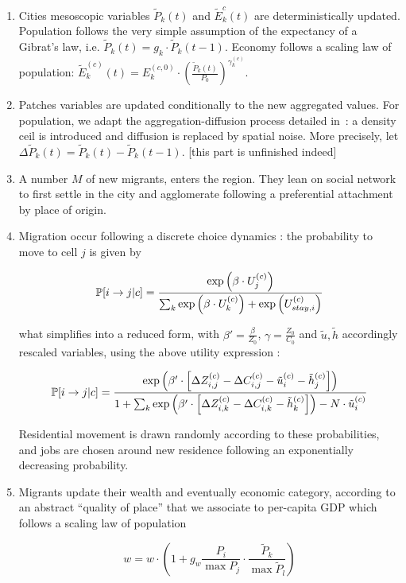 \begin{enumerate}
\item Cities mesoscopic variables $\tilde{P}_k(t)$ and $\tilde{E}_k^{c}(t)$ are deterministically updated. Population follows the very simple assumption of the expectancy of a Gibrat's law, i.e. $\tilde{P}_k(t)= g_k \cdot \tilde{P}_k(t-1)$. Economy follows a scaling law of population: $\tilde{E}_k^{(c)}(t) = E_k^{(c,0)}\cdot \left(\frac{\tilde{P}_k(t)}{P_0}\right)^{\gamma_k^{(c)}}$.

\item Patches variables are updated conditionally to the new aggregated values. For population, we adapt the aggregation-diffusion process detailed in~\cite{raimbault2016calibration}: a density ceil is introduced and diffusion is replaced by spatial noise. More precisely, let $\Delta \tilde{P}_k(t) = \tilde{P}_k(t) - \tilde{P}_k(t-1)$. [this part is unfinished indeed]

\item A number $M$ of new migrants, enters the region. They lean on social network %
to first settle in the city and agglomerate following a preferential attachment by place of origin.
\item Migration occur following a discrete choice dynamics : the probability to move to cell $j$ is given by

\[
\operatorname{\mathbb{P}}\!\left[i\rightarrow j | c\right] = \frac{\exp{\left(\beta\cdot U_j^{(c)}\right)}}{\sum_k \exp{\left(\beta\cdot U_k^{(c)}\right)}+\exp{\left(U_{stay,i}^{(c)}\right)}}
\]

what simplifies into a reduced form, with $\beta' = \frac{\beta}{Z_0}$, $\gamma = \frac{Z_0}{C_0}$ and $\tilde{u},\tilde{h}$ accordingly rescaled variables, using the above utility expression :

\[
\operatorname{\mathbb{P}}\!\left[i\rightarrow j | c\right] = \frac{\exp{\left(\beta'\cdot \left[\Delta Z_{i,j}^{(c)} - \Delta C_{i,j}^{(c)} - \tilde{u}_i^{(c)} - \tilde{h}_j^{(c)} \right] \right)}}{1 + \sum_k {\exp{\left(\beta'\cdot \left[\Delta Z_{i,k}^{(c)} - \Delta C_{i,k}^{(c)} - \tilde{h}_k^{(c)} \right] \right)} - N\cdot \tilde{u}_i^{(c)}}}
\]

Residential movement is drawn randomly according to these probabilities, and jobs are chosen around new residence following an exponentially decreasing probability.

\item Migrants update their wealth and eventually economic category, according to an abstract ``quality of place'' that we associate to per-capita GDP which follows a scaling law of population


\[
w = w\cdot \left( 1 + g_{w} \frac{P_i}{\max P_j} \cdot \frac{\tilde{P}_k}{\max \tilde{P}_l} \right)
\]

\end{enumerate}


